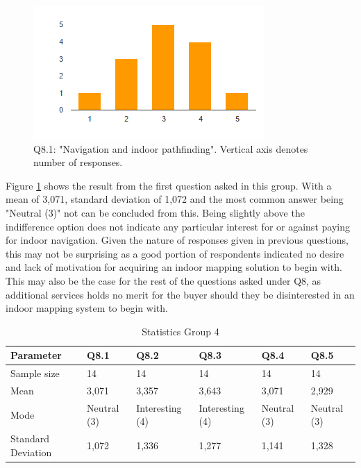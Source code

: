 \begin{figure}[H]
\centering
\includegraphics{figs/q81.PNG}
\caption{Q8.1: "Navigation and indoor pathfinding". Vertical axis denotes number of responses.}
\label{fig:q81}
\end{figure}
Figure \ref{fig:q81} shows the result from the first question asked in this group. With a mean of 3,071, standard deviation of 1,072 and the most common answer being "Neutral (3)" not can be concluded from this. Being slightly above the indifference option does not indicate any particular interest for or against paying for indoor navigation. Given the nature of responses given in previous questions, this may not be surprising as a good portion of respondents indicated no desire and lack of motivation for acquiring an indoor mapping solution to begin with. This may also be the case for the rest of the questions asked under Q8, as additional services holds no merit for the buyer should they be disinterested in an indoor mapping system to begin with.

\begin{table}[]
\centering
\begin{tabular}{|l|l|l|l|l|l|}
\hline
\textbf{Parameter} & \textbf{Q8.1} & \textbf{Q8.2}   & \textbf{Q8.3}   & \textbf{Q8.4} & \textbf{Q8.5} \\ \hline
Sample size        & 14            & 14              & 14              & 14            & 14            \\ \hline
Mean               & 3,071         & 3,357           & 3,643           & 3,071         & 2,929         \\ \hline
Mode               & Neutral (3)   & Interesting (4) & Interesting (4) & Neutral (3)   & Neutral (3)   \\ \hline
Standard Deviation & 1,072         & 1,336           & 1,277           & 1,141         & 1,328         \\ \hline
\end{tabular}
\caption{Statistics Group 4}
\label{table:gr4}
\end{table}


